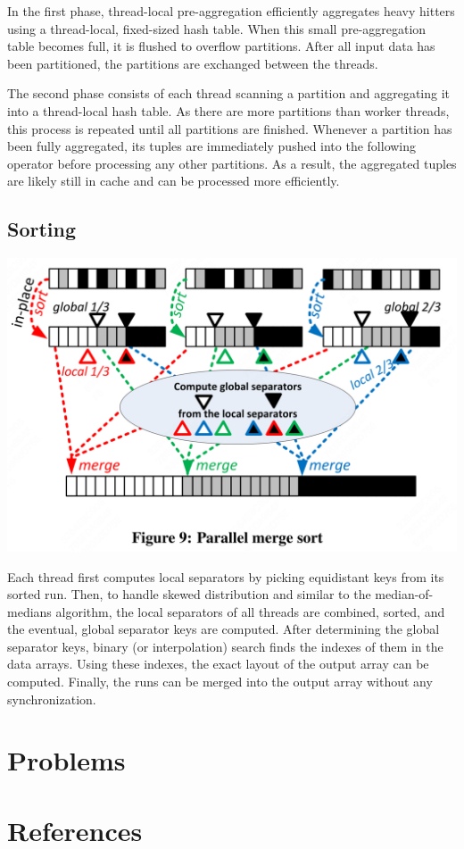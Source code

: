 \documentclass[11pt]{article}
\begin{document}
In the first phase, thread-local pre-aggregation efficiently aggregates heavy hitters using a
thread-local, fixed-sized hash table. When this small pre-aggregation table becomes full, it is
flushed to overflow partitions. After all input data has been partitioned, the partitions are
exchanged between the threads.

The second phase consists of each thread scanning a partition and aggregating it into a thread-local
hash table. As there are more partitions than worker threads, this process is repeated until all
partitions are finished. Whenever a partition has been fully aggregated, its tuples are immediately
pushed into the following operator before processing any other partitions. As a result, the aggregated
tuples are likely still in cache and can be processed more efficiently.
\subsection{Sorting}
\label{sec:org4a44ffd}
\begin{center}
\includegraphics[width=.7\textwidth]{../../images/papers/158.png}
\label{f9}
\end{center}

Each thread first computes local separators by picking equidistant keys from its sorted run. Then, to
handle skewed distribution and similar to the median-of-medians algorithm, the local separators of all
threads are combined, sorted, and the eventual, global separator keys are computed. After determining
the global separator keys, binary (or interpolation) search finds the indexes of them in the data
arrays. Using these indexes, the exact layout of the output array can be computed. Finally, the runs
can be merged into the output array without any synchronization. 
\section{Problems}
\label{sec:orgcd3a22d}


\section{References}
\label{sec:org03ee25a}
\label{bibliographystyle link}


\label{bibliography link}

\end{document}

